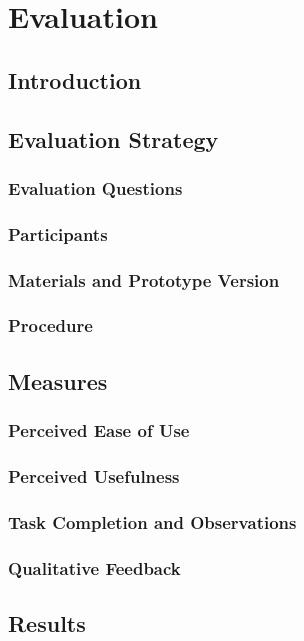 \chapter{Evaluation}

\section{Introduction}

\section{Evaluation Strategy}
\subsection{Evaluation Questions}
\subsection{Participants}
\subsection{Materials and Prototype Version}
\subsection{Procedure}

\section{Measures}
\subsection{Perceived Ease of Use}
\subsection{Perceived Usefulness}
\subsection{Task Completion and Observations}
\subsection{Qualitative Feedback}

\section{Results}
